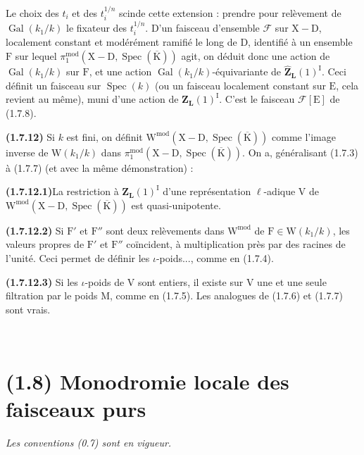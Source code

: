 \documentclass[11pt,leqno]{article}
\newcommand{\Page}[1]{\ifvmode\noindent\else\unskip\ \fi{\footnotesize\textcolor{gray}{[p.\,#1]}}\ \ignorespaces}
\begin{document}
Le choix des \(t_i\) et des \(t_i^{1/n}\) scinde cette extension : prendre pour relèvement de \(\operatorname{Gal}(k_1/k)\) le fixateur des \(t_i^{1/n}\). D’un faisceau d’ensemble \(\mathscr{F}\) sur \(\mathrm{X}-\mathrm{D}\), localement constant et modérément ramifié le long de \(\mathrm{D}\), identifié à un ensemble \(\mathrm{F}\) sur lequel \(\pi_1^{\mathrm{mod}}(\mathrm{X}-\mathrm{D},\operatorname{Spec}(\overline{\mathrm{K}}))\) agit, on déduit donc une action de \(\operatorname{Gal}(k_1/k)\) sur \(\mathrm{F}\), et une action \(\operatorname{Gal}(k_1/k)\)-équivariante de \(\widehat{\mathbf{Z}}_{\mathbf{L}}(1)^{\mathrm{I}}\). Ceci définit un faisceau sur \(\operatorname{Spec}(k)\) (ou un faisceau localement constant sur \(\mathrm{E}\), cela revient au même), muni d’une action de \(\mathbf{Z}_{\mathbf{L}}(1)^{\mathrm{I}}\). C’est le faisceau \(\mathscr{F}[\mathrm{E}]\) de (1.7.8).

\textbf{(1.7.12)} Si \(k\) est fini, on définit \(\mathrm{W}^{\mathrm{mod}}(\mathrm{X}-\mathrm{D},\operatorname{Spec}(\overline{\mathrm{K}}))\) comme l’image inverse de \(\mathrm{W}(k_1/k)\) dans \(\pi_1^{\mathrm{mod}}(\mathrm{X}-\mathrm{D},\operatorname{Spec}(\overline{\mathrm{K}}))\). On a, généralisant (1.7.3) à (1.7.7) (et avec la même démonstration) :

\textbf{(1.7.12.1)}La restriction à \(\mathbf{Z}_{\mathbf{L}}(1)^{\mathrm{I}}\) d’une représentation \(\ell\)-adique \(\mathrm{V}\) de \(\mathrm{W}^{\mathrm{mod}}(\mathrm{X}-\mathrm{D},\operatorname{Spec}(\overline{\mathrm{K}}))\) est quasi-unipotente.

\textbf{(1.7.12.2)} Si \(\mathrm{F}'\) et \(\mathrm{F}''\) sont deux relèvements dans \(\mathrm{W}^{\mathrm{mod}}\) de \(\mathrm{F}\in\mathrm{W}(k_1/k)\), les valeurs propres de \(\mathrm{F}'\) et \(\mathrm{F}''\) coïncident, à multiplication près par des racines de l’unité. Ceci permet de définir les \(\iota\)-poids..., comme en (1.7.4).

\textbf{(1.7.12.3)} Si les \(\iota\)-poids de \(\mathrm{V}\) sont entiers, il existe sur \(\mathrm{V}\) une et une seule filtration par le poids \(\mathrm{M}\), comme en (1.7.5). Les analogues de (1.7.6) et (1.7.7) sont vrais.

\Page{175}
\section*{(1.8) Monodromie locale des faisceaux purs}

\textit{Les conventions \textup{(0.7)} sont en vigueur.}
\end{document}
